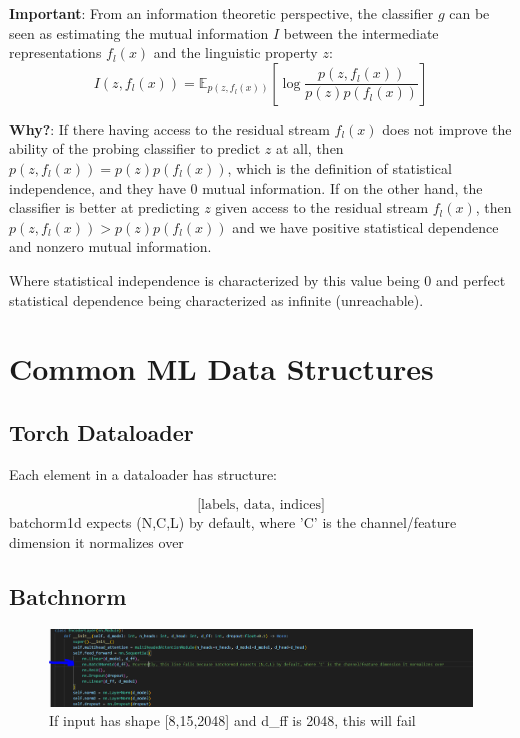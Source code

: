 \documentclass[12pt]{article}
\begin{document}
\textbf{Important}: From an information theoretic perspective, the classifier \(g\) can be seen as estimating the mutual information \(I\) between the intermediate representations \(f_l(x)\) and the linguistic property \(z\): 
\[I(z, f_l(x)) = \mathbb{E}_{p(z,f_l(x))}\left[\log \frac{p(z, f_l(x))}{p(z)p(f_l(x))}\right]\]

\textbf{Why?}: If there having access to the residual stream \(f_l(x)\) does not improve the ability of the probing classifier to predict \(z\) at all, then \(p(z, f_l(x)) = p(z)p(f_l(x))\), which is the definition of statistical independence, and they have 0 mutual information. If on the other hand, the classifier is better at predicting \(z\) given access to the residual stream \(f_l(x)\), then  \(p(z, f_l(x)) > p(z)p(f_l(x))\) and we have positive statistical dependence and nonzero mutual information.

Where statistical independence is characterized  by this value being 0 and perfect statistical dependence being characterized as infinite (unreachable).

\section{Common ML Data Structures}
\subsection {Torch Dataloader}
Each element in a dataloader has structure: 

\[\text{[labels, data, indices]}\]
batchorm1d expects (N,C,L) by default, where 'C' is the channel/feature dimension it normalizes over
\subsection {Batchnorm}
\begin{figure}[H]
    \centering
    \includegraphics[width=1.0\textwidth]{./torch_batchnorm_error.png} %
	\caption{If input has shape [8,15,2048] and d\_ff is 2048, this will fail}
\end{figure}
\end{document}
